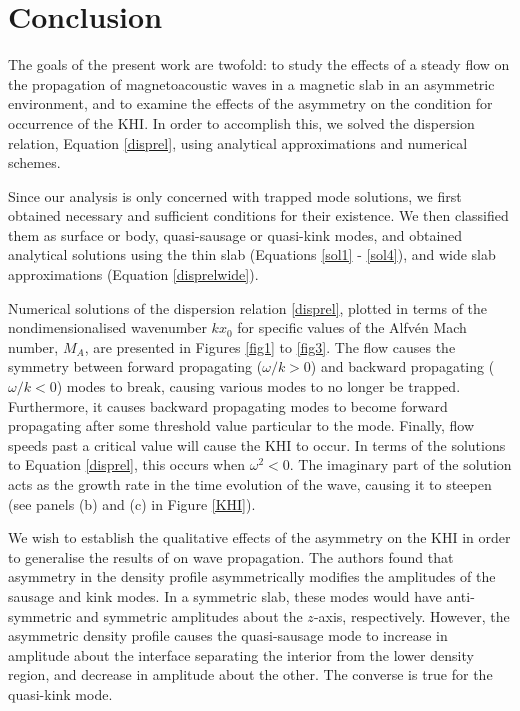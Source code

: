 \section{Conclusion}

The goals of the present work are twofold: to study the effects of a steady flow on the propagation of magnetoacoustic waves in a magnetic slab in an asymmetric environment, and to examine the effects of the asymmetry on the condition for occurrence of the KHI.
In order to accomplish this, we solved the dispersion relation, Equation \eqref{disprel}, using analytical approximations and numerical schemes.

Since our analysis is only concerned with trapped mode solutions, we first obtained necessary and sufficient conditions for their existence. We then classified them as surface or body, quasi-sausage or quasi-kink modes, and obtained analytical solutions using the thin slab (Equations \eqref{sol1} - \eqref{sol4}), and wide slab approximations (Equation \eqref{disprelwide}).

Numerical solutions of the dispersion relation \eqref{disprel}, plotted in terms of the nondimensionalised wavenumber $k x_0$ for specific values of the Alfv\'en Mach number, $M_A$, are presented in Figures \ref{fig1} to \ref{fig3}. The flow causes the symmetry between forward propagating ($\omega / k > 0$) and backward propagating ($\omega / k <0$) modes to break, causing various modes to no longer be trapped. Furthermore, it causes backward propagating modes to become forward propagating after some threshold value particular to the mode. Finally, flow speeds past a critical value will cause the KHI to occur. In terms of the solutions to Equation \eqref{disprel}, this occurs when $\omega^2 < 0$. The imaginary part of the solution acts as the growth rate in the time evolution of the wave, causing it to steepen (see panels (b) and (c) in Figure \ref{KHI}).

We wish to establish the qualitative effects of the asymmetry on the KHI in order to generalise the results of \cite{Allcock2017} on wave propagation.
The authors found that asymmetry in the density profile asymmetrically modifies the amplitudes of the sausage and kink modes.
In a symmetric slab, these modes would have anti-symmetric and symmetric amplitudes about the $z$-axis, respectively.
However, the asymmetric density profile causes the quasi-sausage mode to increase in amplitude about the interface separating the interior from the lower density region, and decrease in amplitude about the other.
The converse is true for the quasi-kink mode.

